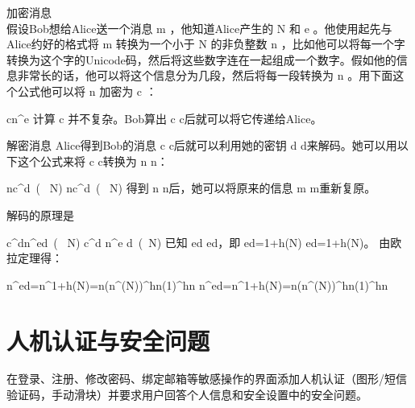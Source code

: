 加密消息\\
假设Bob想给Alice送一个消息 {\displaystyle m} ，他知道Alice产生的 {\displaystyle N} 和 {\displaystyle e} 。他使用起先与Alice约好的格式将 {\displaystyle m} 转换为一个小于 {\displaystyle N} 的非负整数 {\displaystyle n} ，比如他可以将每一个字转换为这个字的Unicode码，然后将这些数字连在一起组成一个数字。假如他的信息非常长的话，他可以将这个信息分为几段，然后将每一段转换为 {\displaystyle n} 。用下面这个公式他可以将 {\displaystyle n} 加密为 {\displaystyle c} ：

{\displaystyle c\equiv n^{e}{}}
计算 {\displaystyle c} 并不复杂。Bob算出 {\displaystyle c} c后就可以将它传递给Alice。

解密消息
Alice得到Bob的消息 {\displaystyle c} c后就可以利用她的密钥 {\displaystyle d} d来解码。她可以用以下这个公式来将 {\displaystyle c} c转换为 {\displaystyle n} n：

{\displaystyle n\equiv c^{d}\ ( \ N)} {\displaystyle n\equiv c^{d}\ ( \ N)}
得到 {\displaystyle n} n后，她可以将原来的信息 {\displaystyle m} m重新复原。

解码的原理是

{\displaystyle c^{d}\equiv n^{e\cdot d}\ ( \ N)}  c^d \equiv n^{e \cdot d}\ (\ N)
已知 {\displaystyle ed} {\displaystyle ed}，即 {\displaystyle ed=1+h\varphi (N)} {\displaystyle ed=1+h\varphi (N)}。 由欧拉定理得：

{\displaystyle n^{ed}=n^{1+h\varphi (N)}=n\left(n^{\varphi (N)}\right)^{h}\equiv n(1)^{h}{}\equiv n{}} {\displaystyle n^{ed}=n^{1+h\varphi (N)}=n\left(n^{\varphi (N)}\right)^{h}\equiv n(1)^{h}{}\equiv n{}}
    
    \subsection{}
    \section{人机认证与安全问题}
    在登录、注册、修改密码、绑定邮箱等敏感操作的界面添加人机认证（图形/短信验证码，手动滑块）并要求用户回答个人信息和安全设置中的安全问题。
